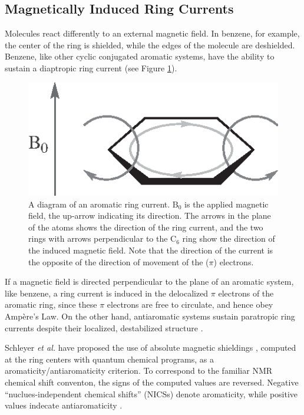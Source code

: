 \subsection{\label{ch1.sec.magnet}Magnetically Induced Ring Currents}
Molecules react differently to an external magnetic field. In benzene, for example, the center of the ring is shielded, while the edges of the molecule are deshielded. Benzene, like other cyclic conjugated aromatic systems, have the ability to sustain a diaptropic ring current \cite{nics1} (see Figure \ref{ch1.fig.ringcurrent}).
\begin{figure}[htp]
\center
\includegraphics{introduction/figures/ringcurrent.eps}
\caption{A diagram of an aromatic ring current. $\mathrm{B_0}$ is the applied magnetic field, the up-arrow indicating its direction. The arrows in the plane of the atoms shows the direction of the ring current, and the two rings with arrows perpendicular to the C$_6$ ring show the direction of the induced magnetic field. Note that the direction of the current is the opposite of the direction of movement of the ($\pi$) electrons.}
\label{ch1.fig.ringcurrent}
\end{figure}
If a magnetic field is directed perpendicular to the plane of an aromatic system, like benzene, a ring current is induced in the delocalized $\pi$ electrons of the aromatic ring, since these $\pi$ electrons are free to circulate, and hence obey Amp\`{e}re's Law. On the other hand, antiaromatic systems sustain paratropic ring currents despite their localized, destabilized structure \cite{nics1}.

Schleyer \textit{et al.} have proposed the use of absolute magnetic shieldings \cite{nics1,nics2,nics3,nics4}, computed at the ring centers with quantum chemical programs, as a aromaticity/antiaromaticity criterion. To correspond to the familiar NMR chemical shift conventon, the signs of the computed values are reversed. Negative ``nuclues-independent chemical shifts'' (NICSs) denote aromaticity, while positive values indecate antiaromaticity \cite{nics1}.


